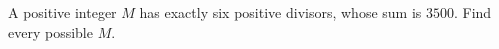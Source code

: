 A positive integer $M$ has exactly six positive divisors, whose sum is $3500$. Find every possible $M$.
